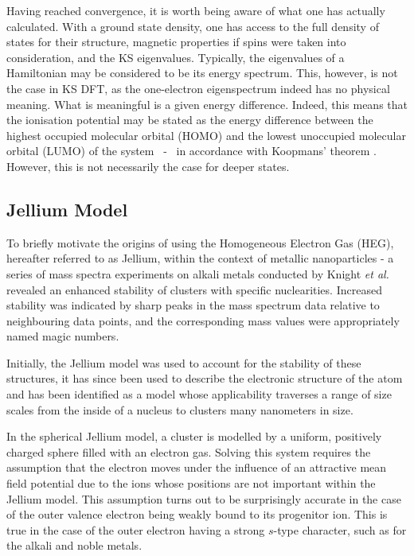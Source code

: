 Having reached convergence, it is worth being aware of what one has actually calculated. With a ground state density, one has access to the full density of states for their structure, magnetic properties if spins were taken into consideration, and the KS eigenvalues. Typically, the eigenvalues of a Hamiltonian may be considered to be its energy spectrum. This, however, is not the case in KS DFT, as the one-electron eigenspectrum indeed has no physical meaning. What is meaningful is a given energy difference. Indeed, this means that the ionisation potential may be stated as the energy difference between the highest occupied molecular orbital (HOMO) and the lowest unoccupied molecular orbital (LUMO) of the system ~-~ in accordance with Koopmans' theorem \cite{KOOPMANS1934104,HAMEL2002345}. However, this is not necessarily the case for deeper states.

\subsection{Jellium Model}
\label{sec:JML_Thr}
To briefly motivate the origins of using the Homogeneous Electron Gas (HEG), hereafter referred to as Jellium, within the context of metallic nanoparticles - a series of mass spectra experiments on alkali metals conducted by Knight \textit{et al.} \cite{Knight_Cluster} revealed an enhanced stability of clusters with specific nuclearities. Increased stability was indicated by sharp peaks in the mass spectrum data relative to neighbouring data points, and the corresponding mass values were appropriately named magic numbers.

Initially, the Jellium model was used to account for the stability of these structures, it has since been used to describe the electronic structure of the atom and has been identified as a model whose applicability traverses a range of size scales from the inside of a nucleus to clusters many nanometers in size.

In the spherical Jellium model, a cluster is modelled by a uniform, positively charged sphere filled with an electron gas. Solving this system requires the assumption that the electron moves under the influence of an attractive mean field potential due to the ions whose positions are not important within the Jellium model. This assumption turns out to be surprisingly accurate in the case of the outer valence electron being weakly bound to its progenitor ion. This is true in the case of the outer electron having a strong $s$-type character, such as for the alkali and noble metals.

